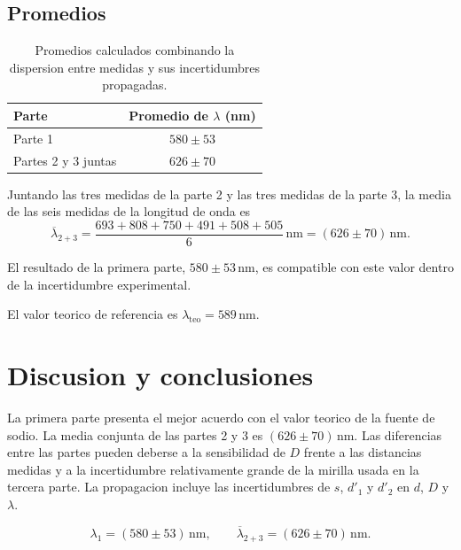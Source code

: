 \documentclass[a4paper,11pt]{article}
\begin{document}
\subsection{Promedios}
\begin{table}[H]
\centering
\begin{tabular}{lc}
\toprule
\textbf{Parte} & \textbf{Promedio de $\lambda$ (nm)} \\
\midrule
Parte 1 & $580\pm53$ \\
Partes 2 y 3 juntas & $626\pm70$ \\
\bottomrule
\end{tabular}
\caption{Promedios calculados combinando la dispersion entre medidas y sus incertidumbres propagadas.}
\label{tab:promedios}
\end{table}

Juntando las tres medidas de la parte 2 y las tres medidas de la parte 3, la media
de las seis medidas de la longitud de onda es
\begin{equation}
\overline{\lambda}_{2+3}
 = \frac{693+808+750+491+508+505}{6}\,\mathrm{nm}
 = (626\pm70)\,\mathrm{nm}.
\end{equation}

El resultado de la primera parte, $580\pm53\,\mathrm{nm}$, es compatible con
este valor dentro de la incertidumbre experimental.

El valor teorico de referencia es $\lambda_\mathrm{teo}=589\,\mathrm{nm}$.

\section{Discusion y conclusiones}
La primera parte presenta el mejor acuerdo con el valor teorico de la fuente de
sodio. La media conjunta de las partes 2 y 3 es $(626\pm70)\,\mathrm{nm}$.
Las diferencias entre las partes pueden deberse a la sensibilidad de $D$ frente a
las distancias medidas y a la incertidumbre relativamente grande de la mirilla
usada en la tercera parte. La propagacion incluye las incertidumbres de $s$,
$d'_1$ y $d'_2$ en $d$, $D$ y $\lambda$.

\begin{equation}
\lambda_1 = (580\pm53)\,\mathrm{nm}, \qquad
\overline{\lambda}_{2+3} = (626\pm70)\,\mathrm{nm}.
\end{equation}
\end{document}

